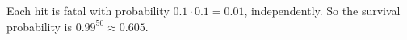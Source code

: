 Each hit is fatal with probability $0.1\cdot0.1=0.01$, independently. So the survival probability is $0.99^{50}\approx\boxed{0.605}$.
